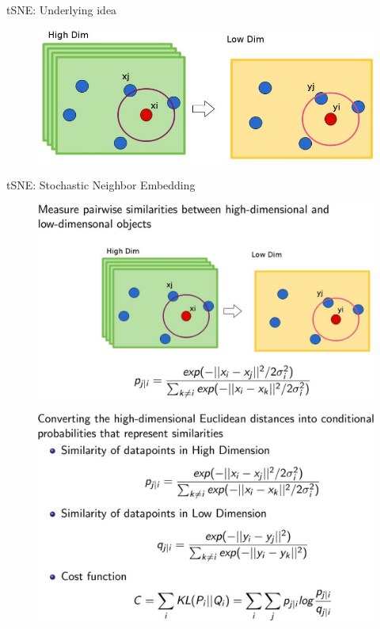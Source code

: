 \begin{frame}[allowframebreaks]{tSNE: Underlying idea}
    \begin{figure}
        \centering
        \includegraphics[width=1\textwidth,keepaspectratio]{images/dul/dim-reduce/tsne-high2low.jpg}
    \end{figure}
\end{frame}

\begin{frame}[allowframebreaks]{tSNE: Stochastic Neighbor Embedding}
    \begin{figure}
        \centering
        \includegraphics[width=1\textwidth,keepaspectratio]{images/dul/dim-reduce/tsne-stochastic.jpg}
    \end{figure}

    \framebreak

    \begin{figure}
        \centering
        \includegraphics[width=1\textwidth,keepaspectratio]{images/dul/dim-reduce/tsne-stochastic-steps.jpg}
    \end{figure}
\end{frame}

